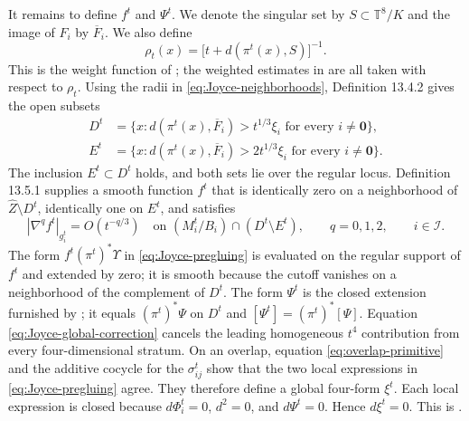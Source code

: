 \documentclass[11pt]{article}
\theoremstyle{remark}\newtheorem{remark}[theorem]{Remark}
\newcommand{\T}{\mathbb T}
\begin{document}
It remains to define $f^t$ and $\Psi^t$.  We denote the singular set by
$S\subset\T^8/K$ and the image of $F_i$ by $\overline F_i$.  We also define
\[
 \rho_t(x)=\bigl[t+d(\pi^t(x),S)\bigr]^{-1}.
\]
This is the weight function of
\cite[Definition 13.4.2]{JoyceBook}; the weighted estimates in
\cite[Propositions 13.4.3--13.5.7]{JoyceBook} are all taken with respect
to $\rho_t$.  Using the radii in \eqref{eq:Joyce-neighborhoods},
Definition 13.4.2 gives the open subsets
\begin{align*}
 D^t&=\{x:d(\pi^t(x),\overline F_i)>t^{1/3}\xi_i
             \text{ for every }i\ne\mathbf 0\},\\
 E^t&=\{x:d(\pi^t(x),\overline F_i)>2t^{1/3}\xi_i
             \text{ for every }i\ne\mathbf 0\}.
\end{align*}
The inclusion $E^t\subset D^t$ holds, and both sets lie over the regular
locus.  Definition 13.5.1 supplies a smooth function $f^t$ that is
identically zero on a neighborhood of $\widehat Z\setminus D^t$,
identically one on $E^t$, and satisfies
\[
 |\nabla^q f^t|_{g_i^t}=O(t^{-q/3})
 \quad\text{on }(M_i^t/B_i)\cap(D^t\setminus E^t),
 \qquad q=0,1,2,\qquad i\in\mathcal I.
\]
The form
$f^t(\pi^t)^*\Upsilon$ in \eqref{eq:Joyce-pregluing} is evaluated on the
regular support of $f^t$ and extended by zero; it is smooth because the
cutoff vanishes on a neighborhood of the complement of $D^t$.  The form
$\Psi^t$ is the closed extension furnished by
\cite[Proposition 13.4.4]{JoyceBook}; it equals $(\pi^t)^*\Psi$ on $D^t$ and
$[\Psi^t]=(\pi^t)^*[\Psi]$.  Equation
\eqref{eq:Joyce-global-correction} cancels the leading homogeneous
$t^4$ contribution from every four-dimensional stratum.  On an overlap,
equation \eqref{eq:overlap-primitive} and the additive cocycle for the
$\sigma_{ij}^t$ show that the two local expressions in
\eqref{eq:Joyce-pregluing} agree.  They therefore define a global
four-form $\xi^t$.  Each local expression is closed because
$d\Phi_i^t=0$, $d^2=0$, and $d\Psi^t=0$.  Hence $d\xi^t=0$.  This is
\cite[Definition 13.5.1 and Proposition 13.5.2]{JoyceBook}.
\end{document}
